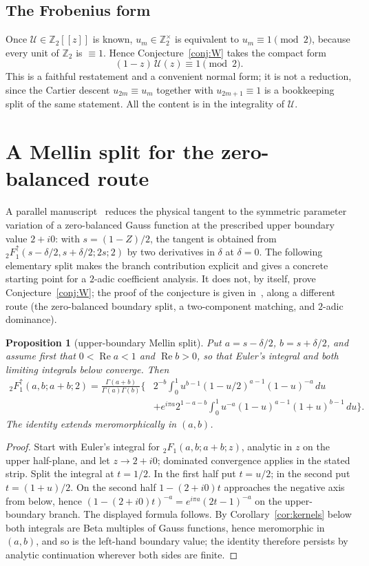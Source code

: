 \documentclass[12pt]{amsart}
\newtheorem{proposition}[theorem]{Proposition}
\theoremstyle{definition}
\theoremstyle{remark}
\newcommand{\Zt}{\mathbb Z_2}
\begin{document}
\subsection{The Frobenius form}

Once $\mathcal U\in\Zt[[z]]$ is known, $u_m\in\Zt^\times$ is equivalent to $u_m\equiv1\pmod 2$, because every unit of $\Zt$ is $\equiv1$.  Hence Conjecture~\ref{conj:W} takes the compact form
\[
  (1-z)\,\mathcal U(z)\equiv1\pmod 2 .
\]
This is a faithful restatement and a convenient normal form; it is not a reduction, since the Cartier descent $u_{2m}\equiv u_m$ together with
$u_{2m+1}\equiv1$ is a bookkeeping split of the same statement.  All the content is in the integrality of $\mathcal U$.


\section{A Mellin split for the zero-balanced route}\label{sec:mellinsplit}
A parallel manuscript~\cite{Ultraspherical} reduces the physical tangent to the symmetric parameter variation of a zero-balanced Gauss function at the prescribed upper boundary value $2+i0$: with $s=(1-Z)/2$, the tangent is obtained from ${}_2F_1^{\uparrow}(s-\delta/2,s+\delta/2;2s;2)$ by two derivatives in $\delta$ at $\delta=0$.  The following elementary split makes the branch contribution explicit and gives a concrete starting point for a $2$-adic coefficient analysis.  It does not, by itself, prove Conjecture~\ref{conj:W}; the proof of the conjecture is given in~\cite{Ultraspherical}, along a different route (the zero-balanced boundary split, a two-component matching, and $2$-adic dominance).

\begin{proposition}[upper-boundary Mellin split]\label{prop:mellinsplit}
Put $a=s-\delta/2$, $b=s+\delta/2$, and assume first that $0<\operatorname{Re}a<1$ and $\operatorname{Re}b>0$, so that Euler's integral and both limiting integrals below converge.  Then
\begin{align*}
 {}_2F_1^{\uparrow}(a,b;a+b;2)
 =\frac{\Gamma(a+b)}{\Gamma(a)\Gamma(b)}\bigg\{&
 2^{-b}\int_0^1 u^{b-1}(1-u/2)^{a-1}(1-u)^{-a}\,du\\
 &+e^{i\pi a}2^{1-a-b}\int_0^1
 u^{-a}(1-u)^{a-1}(1+u)^{b-1}\,du\bigg\}.
\end{align*}
The identity extends meromorphically in $(a,b)$.
\end{proposition}
\begin{proof}
Start with Euler's integral for ${}_2F_1(a,b;a+b;z)$, analytic in $z$ on the upper half-plane, and let $z\to2+i0$; dominated convergence applies in the stated strip.  Split the integral at $t=1/2$.  In the first half put $t=u/2$; in the second put $t=(1+u)/2$.  On the second half $1-(2+i0)t$ approaches the negative axis from below, hence $(1-(2+i0)t)^{-a}=e^{i\pi a}(2t-1)^{-a}$ on the upper-boundary branch. The displayed formula follows.  By Corollary~\ref{cor:kernels} below both integrals are Beta multiples of Gauss functions, hence meromorphic in $(a,b)$, and so is the left-hand boundary value; the identity therefore persists by analytic continuation wherever both sides are finite.
\end{proof}
\end{document}
